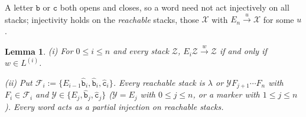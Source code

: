 \documentclass[11pt]{article}
\numberwithin{equation}{section}
\theoremstyle{plain}
\newtheorem{lemma}[theorem]{Lemma}
\theoremstyle{definition}
\theoremstyle{remark}
\theoremstyle{plain}
\newcommand{\eps}{\lambda}
\begin{document}
A letter $\mathtt b$ or $\mathtt c$ both opens and closes, so a word need not act
injectively on all stacks; injectivity holds on the \emph{reachable} stacks,
those $\mathcal X$ with $E_n\xrightarrow{u}\mathcal X$ for some $u$.

\begin{lemma}\label{lem:app-br-recognition}
\label{lem:app-tl-reachable}
\textup{(i)} For $0\le i\le n$ and every stack $\mathcal Z$,
$E_i\mathcal Z\xrightarrow{w}\mathcal Z$ if and only if $w\in L^{(i)}$.

\textup{(ii)} Put $\mathcal F_i:=\{E_{i-1}\hat{\mathtt b}_i,\hat{\mathtt b}_i,\hat{\mathtt c}_i\}$.
Every reachable stack is $\eps$ or $\mathcal YF_{j+1}\cdots F_n$ with
$F_i\in\mathcal F_i$ and $\mathcal Y\in\{E_j,\hat{\mathtt b}_j,\hat{\mathtt c}_j\}$
\textup($\mathcal Y=E_j$ with $0\le j\le n$, or a marker with $1\le j\le n$\textup).
Every word acts as a partial injection on reachable stacks.
\end{lemma}
\end{document}
